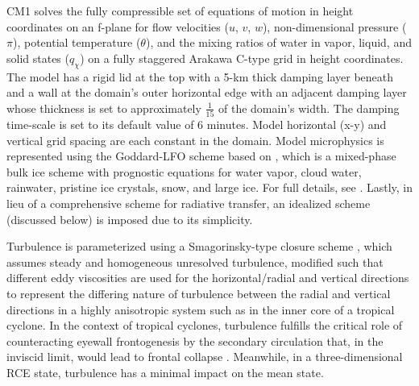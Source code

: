 \documentclass[12pt]{article}
\begin{document}
CM1 solves the fully compressible set of equations of motion in height coordinates on an f-plane for flow velocities ($u$, $v$, $w$), non-dimensional pressure ($\pi$), potential temperature ($\theta$), and the mixing ratios of water in vapor, liquid, and solid states ($q_\chi$) on a fully staggered Arakawa C-type grid in height coordinates. The model has a rigid lid at the top with a 5-km thick damping layer beneath and a wall at the domain's outer horizontal edge with an adjacent damping layer whose thickness is set to approximately $\frac{1}{15}$ of the domain's width.  The damping time-scale is set to its default value of 6 minutes.  Model horizontal (x-y) and vertical grid spacing are each constant in the domain. Model microphysics is represented using the Goddard-LFO scheme based on \cite{Lin_Farley_Orville_1983}, which is a mixed-phase bulk ice scheme with prognostic equations for water vapor, cloud water, rainwater, pristine ice crystals, snow, and large ice. For full details, see \cite{Bryan_Fritsch_2002}. Lastly, in lieu of a comprehensive scheme for radiative transfer, an idealized scheme (discussed below) is imposed due to its simplicity.

Turbulence is parameterized using a Smagorinsky-type closure scheme \citep{Smagorinsky_1963}, which assumes steady and homogeneous unresolved turbulence, modified such that different eddy viscosities are used for the horizontal/radial and vertical directions to represent the differing nature of turbulence between the radial and vertical directions in a highly anisotropic system such as in the inner core of a tropical cyclone.  In the context of tropical cyclones, turbulence fulfills the critical role of counteracting eyewall frontogenesis by the secondary circulation that, in the inviscid limit, would lead to frontal collapse \citep{Emanuel_1997}.  Meanwhile, in a three-dimensional RCE state, turbulence has a minimal impact on the mean state.
\end{document}

